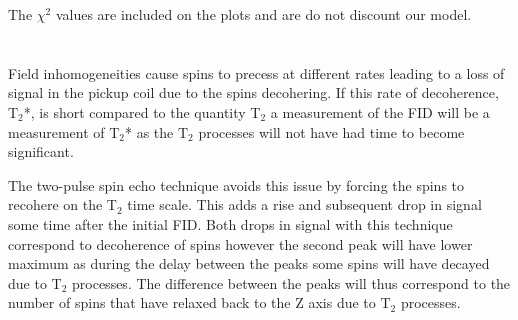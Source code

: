 \documentclass[11pt,letterpaper]{article}
\begin{document}
The $\chi^2$ values are included on the plots and are do not discount our model.
\section{} %
Field inhomogeneities cause spins to precess at different rates leading to a loss of signal in the pickup coil due to the spins decohering. If this rate of decoherence, T$_2$*,  is short compared to the quantity T$_2$ a measurement of the FID will be a measurement of T$_2$* as the T$_2$ processes will not have had time to become significant. 

The two-pulse spin echo technique avoids this issue by forcing the spins to recohere on the T$_2$ time scale. This adds a rise and subsequent drop in signal some time after the initial FID. Both drops in signal with this technique correspond to decoherence of spins however the second peak will have lower maximum as during the delay between the peaks some spins will have decayed due to T$_2$ processes. The difference between the peaks will thus correspond to the number of spins that have relaxed back to the Z axis due to T$_2$ processes.
\end{document}
